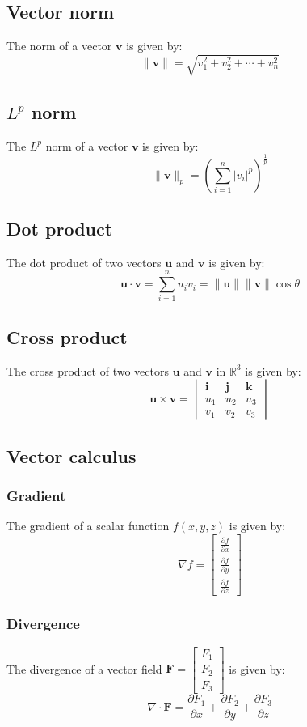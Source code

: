 \documentclass{article}
\begin{document}
\subsection*{Vector norm}
The norm of a vector \(\mathbf{v}\) is given by:
\[
\|\mathbf{v}\| = \sqrt{v_1^2 + v_2^2 + \cdots + v_n^2}
\]

\subsection*{\(L^p\) norm}
The \(L^p\) norm of a vector \(\mathbf{v}\) is given by:
\[
\|\mathbf{v}\|_p = \left( \sum_{i=1}^n |v_i|^p \right)^{\frac{1}{p}}
\]

\subsection*{Dot product}
The dot product of two vectors \(\mathbf{u}\) and \(\mathbf{v}\) is given by:
\[
\mathbf{u} \cdot \mathbf{v} = \sum_{i=1}^n u_i v_i = \|\mathbf{u}\| \|\mathbf{v}\| \cos \theta
\]

\subsection*{Cross product}
The cross product of two vectors \(\mathbf{u}\) and \(\mathbf{v}\) in \(\mathbb{R}^3\) is given by:
\[
\mathbf{u} \times \mathbf{v} = \begin{vmatrix}
\mathbf{i} & \mathbf{j} & \mathbf{k} \\
u_1 & u_2 & u_3 \\
v_1 & v_2 & v_3
\end{vmatrix}
\]

\subsection*{Vector calculus}
\subsubsection*{Gradient}
The gradient of a scalar function \(f(x, y, z)\) is given by:
\[
\nabla f = \begin{bmatrix}
\frac{\partial f}{\partial x} \\
\frac{\partial f}{\partial y} \\
\frac{\partial f}{\partial z}
\end{bmatrix}
\]

\subsubsection*{Divergence}
The divergence of a vector field \(\mathbf{F} = \begin{bmatrix} F_1 \\ F_2 \\ F_3 \end{bmatrix}\) is given by:
\[
\nabla \cdot \mathbf{F} = \frac{\partial F_1}{\partial x} + \frac{\partial F_2}{\partial y} + \frac{\partial F_3}{\partial z}
\]
\end{document}
